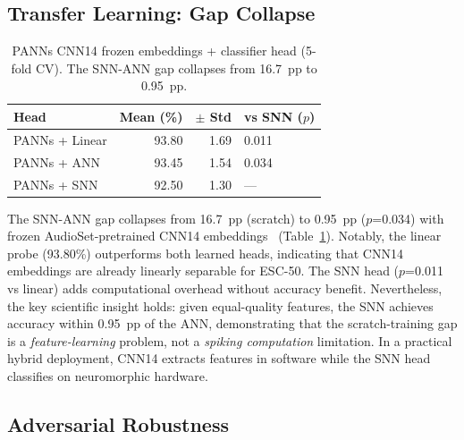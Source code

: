 \documentclass[sigconf,nonacm=false]{acmart}
\begin{document}
\subsection{Transfer Learning: Gap Collapse}

\begin{table}[t]
\caption{PANNs CNN14 frozen embeddings + classifier head (5-fold CV). The SNN-ANN gap collapses from 16.7~pp to 0.95~pp.}
\label{tab:panns}
\small
\begin{tabular}{@{}lrrl@{}}
\toprule
Head & Mean (\%) & $\pm$ Std & vs SNN ($p$) \\
\midrule
PANNs + Linear & 93.80 & 1.69 & 0.011 \\
PANNs + ANN & 93.45 & 1.54 & 0.034 \\
PANNs + SNN & 92.50 & 1.30 & --- \\
\bottomrule
\end{tabular}
\end{table}

The SNN-ANN gap collapses from 16.7~pp (scratch) to 0.95~pp ($p$=0.034) with frozen AudioSet-pretrained CNN14 embeddings~\cite{kong2020} (Table~\ref{tab:panns}). Notably, the linear probe (93.80\%) outperforms both learned heads, indicating that CNN14 embeddings are already linearly separable for ESC-50. The SNN head ($p$=0.011 vs linear) adds computational overhead without accuracy benefit. Nevertheless, the key scientific insight holds: given equal-quality features, the SNN achieves accuracy within 0.95~pp of the ANN, demonstrating that the scratch-training gap is a \emph{feature-learning} problem, not a \emph{spiking computation} limitation. In a practical hybrid deployment, CNN14 extracts features in software while the SNN head classifies on neuromorphic hardware.

\subsection{Adversarial Robustness}
\end{document}
